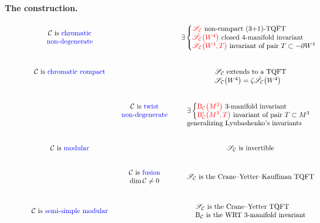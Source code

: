 \documentclass[10pt,a4paper]{amsart}
\numberwithin{equation}{section}
\numberwithin{theorem}{section}
\numberwithin{proposition}{section}
\numberwithin{definition}{section}
\numberwithin{lemma}{section}
\numberwithin{corollary}{section}
\numberwithin{remark}{section}
\numberwithin{example}{section}
\newcommand{\cat}{\mathcal{C}}
\newcommand{\TSkein}{{\mathscr{S}}}
\newcommand{\ThreeManInv}{\mathrm{B}}
\newcommand{\BB}{\ThreeManInv}
\begin{document}
\textbf{The construction.}
\begin{figure}[t]
 \centering
 \small
 \[\begin{tikzcd}[column sep=tiny]
 {\begin{array}{c} \cat\text{ is \color{blue}chromatic}\\\text{\color{blue} non-degenerate}
 \end{array} } &\ & {\exists \left\{\begin{array}{@{}l}{\color{red} \TSkein_\cat}\text{ non-compact (3+1)-TQFT}\\ {\color{red} \dot\TSkein_\cat\bigl(W^4\bigr)} \text{ closed 4-manifold invariant}\\{\color{red} \TSkein_\cat\bigl(W^4,T\bigr)}\text{ invariant of pair }T\subset -\partial W^4\end{array}\right.} \\
 {\cat \text{ is \color{blue}chromatic compact}} &\ & {\begin{array}[t]{l}\TSkein_\cat\text{ extends to a TQFT}\\\TSkein_\cat\bigl(W^4\bigr)=\zeta\dot\TSkein_\cat\bigl(W^4\bigr)\end{array}} \\
 & \begin{array}{c} \cat\text{ is \color{blue}twist}\\
 \text{\color{blue} non-degenerate} \end{array}
 &
 \begin{array}[t]{l}\exists\left\{
 \begin{array}{@{}l}{\color{red} \BB_\cat\bigl(M^3\bigr)}\text{ 3-manifold invariant} \\
 {\color{red}\BB'_\cat\bigl(M^3,T\bigr)}\text{ invariant of pair }T\subset M^3
 \end{array}\right.
 \\\text{generalizing Lyubashenko's invariants}
 \end{array}\\
 {\cat\text{ is \color{blue}modular}} &\ & {
\TSkein_\cat\text{ is invertible}
 }
 \\
 & \begin{array}{c} \cat\text{ is \color{blue}fusion}\\
 \dim\cat\neq0 \end{array} & \TSkein_\cat\text{ is the Crane--Yetter--Kauffman TQFT}\\
 {\cat\text{ is \color{blue}semi-simple modular}} &\ &
 {\begin{array}{l}\TSkein_\cat\text{ is the Crane--Yetter TQFT}\\\BB_\cat\text{ is the WRT 3-manifold invariant}\end{array}}

\end{tikzcd}\]
\end{figure}
\end{document}
